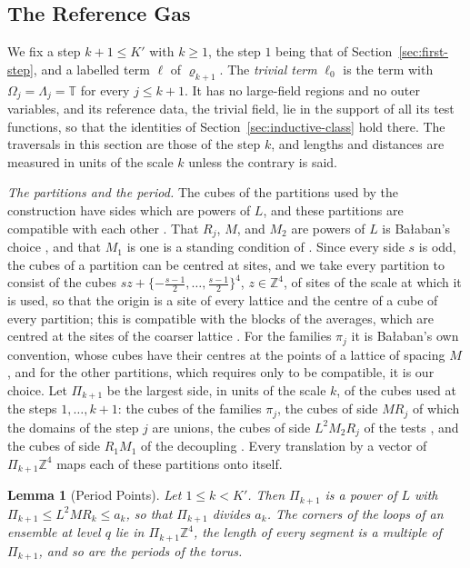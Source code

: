\documentclass[11pt]{preprint}
\numberwithin{equation}{section}
\newtheorem{lemma}[theorem]{Lemma}
\theoremstyle{definition}
\theoremstyle{remark}
\theoremstyle{plain}
\begin{document}
\subsection{The Reference Gas}\label{sec:reference-gas}

We fix a step $k + 1 \leq K'$ with $k \geq 1$, the step $1$ being that of Section~\ref{sec:first-step}, and a labelled term $\ell$ of $\varrho_{k+1}$. The \emph{trivial term} $\ell_0$ is the term with $\Omega_j = \Lambda_j = \mathbb T$ for every $j \leq k + 1$. It has no large-field regions and no outer variables, and its reference data, the trivial field, lie in the support of all its test functions, so that the identities of Section~\ref{sec:inductive-class} hold there. The traversals in this section are those of the step $k$, and lengths and distances are measured in units of the scale $k$ unless the contrary is said.

\emph{The partitions and the period.} The cubes of the partitions used by the construction have sides which are powers of $L$, and these partitions are compatible with each other \cite[p.~245]{BalabanCRE}. That $R_j$, $M$, and $M_2$ are powers of $L$ is Ba{\l}aban's choice \cite[p.~245]{BalabanCRE}, and that $M_1$ is one is a standing condition of \cite[(3.1)]{WilsonFirstStep}. Since every side $s$ is odd, the cubes of a partition can be centred at sites, and we take every partition to consist of the cubes $sz + \{-\frac{s-1}{2}, \dots, \frac{s-1}{2}\}^4$, $z \in \mathbb Z^4$, of sites of the scale at which it is used, so that the origin is a site of every lattice and the centre of a cube of every partition; this is compatible with the blocks of the averages, which are centred at the sites of the coarser lattice \cite[(0.3), p.~252]{BalabanRG1}. For the families $\pi_j$ it is Ba{\l}aban's own convention, whose cubes have their centres at the points of a lattice of spacing $M$ \cite[p.~257]{BalabanRG1}, and for the other partitions, which \cite[p.~245]{BalabanCRE} requires only to be compatible, it is our choice. Let $\Pi_{k+1}$ be the largest side, in units of the scale $k$, of the cubes used at the steps $1, \dots, k + 1$: the cubes of the families $\pi_j$, the cubes of side $MR_j$ of which the domains of the step $j$ are unions, the cubes of side $L^2M_2R_j$ of the tests \cite[(3.2), (3.3), (3.16)]{BalabanCRE}, and the cubes of side $R_1M_1$ of the decoupling \cite[p.~3]{BalabanRG2}. Every translation by a vector of $\Pi_{k+1}\mathbb Z^4$ maps each of these partitions onto itself.

\begin{lemma}[Period Points]\label{lem:period-points}
Let $1 \leq k < K'$. Then $\Pi_{k+1}$ is a power of $L$ with $\Pi_{k+1} \leq L^2MR_k \leq a_k$, so that $\Pi_{k+1}$ divides $a_k$. The corners of the loops of an ensemble at level $q$ lie in $\Pi_{k+1}\mathbb Z^4$, the length of every segment is a multiple of $\Pi_{k+1}$, and so are the periods of the torus.
\end{lemma}
\end{document}

